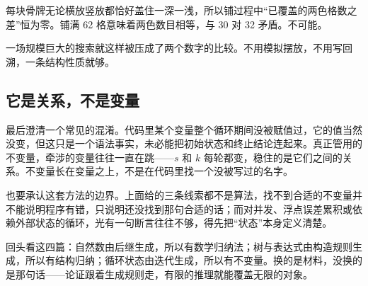 每块骨牌无论横放竖放都恰好盖住一深一浅，所以铺过程中``已覆盖的两色格数之差''恒为零。铺满 62 格意味着两色数目相等，与 30 对 32 矛盾。不可能。

一场规模巨大的搜索就这样被压成了两个数字的比较。不用模拟摆放，不用写回溯，一条结构性质就够。

\subsection{它是关系，不是变量}

最后澄清一个常见的混淆。代码里某个变量整个循环期间没被赋值过，它的值当然没变，但这只是一个语法事实，未必能把初始状态和终止结论连起来。真正管用的不变量，牵涉的变量往往一直在跳——\(s\) 和 \(k\) 每轮都变，稳住的是它们之间的关系。不变量长在变量之上，不是在代码里找一个没被写过的名字。

也要承认这套方法的边界。上面给的三条线索都不是算法，找不到合适的不变量并不能说明程序有错，只说明还没找到那句合适的话；而对并发、浮点误差累积或依赖外部状态的循环，光有一句断言往往不够，得先把``状态''本身定义清楚。

回头看这四篇：自然数由后继生成，所以有数学归纳法；树与表达式由构造规则生成，所以有结构归纳；循环状态由迭代生成，所以有不变量。换的是材料，没换的是那句话——论证跟着生成规则走，有限的推理就能覆盖无限的对象。
